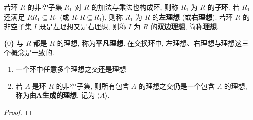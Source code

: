 \documentclass[../../main.tex]{subfiles}
\begin{document}
\begin{definition}
若环 \( R \) 的非空子集 \( R_1 \) 对 \( R \) 的加法与乘法也构成环, 则称 \( R_1 \) 为 \( R \) 的\textbf{子环}. 若 \( R_1 \) 还满足 \( RR_1 \subseteq R_1 \) (或 \( R_1R \subseteq R_1 \)), 则称 \( R_1 \) 为 \( R \) 的\textbf{左理想} (或\textbf{右理想}). 若环 \( R \) 的非空子集 \( I \) 既是左理想又是右理想, 则称 \( I \) 为 \( R \) 的\textbf{双边理想}, 简称\textbf{理想}.
\end{definition}
\begin{remark}
\( \{0\} \) 与 \( R \) 都是 \( R \) 的理想, 称为\textbf{平凡理想}. 在交换环中, 左理想、右理想与理想这三个概念是一致的.
\end{remark}

\begin{theorem}
\begin{enumerate}
\item 一个环中任意多个理想之交还是理想.

\item 若 \( A \) 是环 \( R \) 的非空子集, 则所有包含 \( A \) 的理想之交仍是一个包含 \( A \) 的理想, 称为\textbf{由\(\boldsymbol{A}\)生成的理想}, 记为 \( \langle A \rangle \).
\end{enumerate}
\end{theorem}
\begin{proof}

\end{proof}
\end{document}
